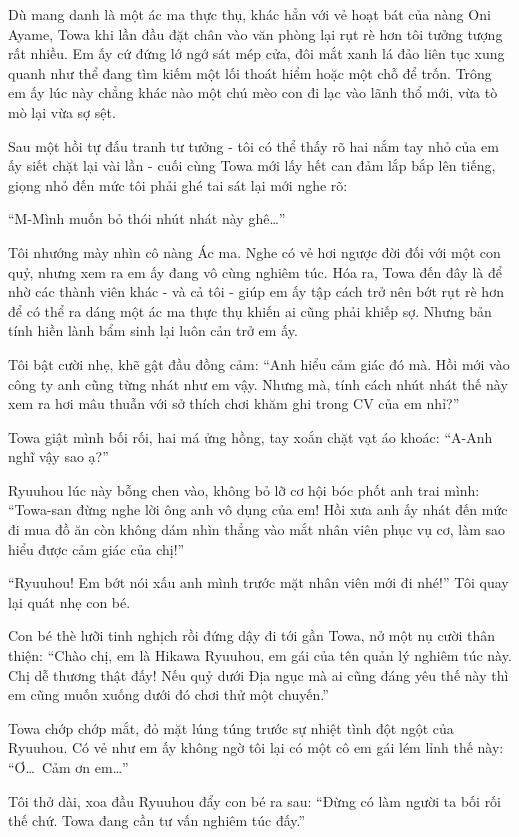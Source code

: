 \documentclass[../main.tex]{subfiles}
\begin{document}
Dù mang danh là một ác ma thực thụ, khác hẳn với vẻ hoạt bát của nàng Oni Ayame, Towa khi lần đầu đặt chân vào văn phòng lại rụt rè hơn tôi tưởng tượng rất nhiều. Em ấy cứ đứng lớ ngớ sát mép cửa, đôi mắt xanh lá đảo liên tục xung quanh như thể đang tìm kiếm một lối thoát hiểm hoặc một chỗ để trốn. Trông em ấy lúc này chẳng khác nào một chú mèo con đi lạc vào lãnh thổ mới, vừa tò mò lại vừa sợ sệt.

Sau một hồi tự đấu tranh tư tưởng - tôi có thể thấy rõ hai nắm tay nhỏ của em ấy siết chặt lại vài lần - cuối cùng Towa mới lấy hết can đảm lắp bắp lên tiếng, giọng nhỏ đến mức tôi phải ghé tai sát lại mới nghe rõ:

``M-Mình muốn bỏ thói nhút nhát này ghê\dots''

Tôi nhướng mày nhìn cô nàng Ác ma. Nghe có vẻ hơi ngược đời đối với một con quỷ, nhưng xem ra em ấy đang vô cùng nghiêm túc. Hóa ra, Towa đến đây là để nhờ các thành viên khác - và cả tôi - giúp em ấy tập cách trở nên bớt rụt rè hơn để có thể ra dáng một ác ma thực thụ khiến ai cũng phải khiếp sợ. Nhưng bản tính hiền lành bẩm sinh lại luôn cản trở em ấy.

Tôi bật cười nhẹ, khẽ gật đầu đồng cảm: ``Anh hiểu cảm giác đó mà. Hồi mới vào công ty anh cũng từng nhát như em vậy. Nhưng mà, tính cách nhút nhát thế này xem ra hơi mâu thuẫn với sở thích chơi khăm ghi trong CV của em nhỉ?''

Towa giật mình bối rối, hai má ửng hồng, tay xoắn chặt vạt áo khoác: ``A-Anh nghĩ vậy sao ạ?''

Ryuuhou lúc này bỗng chen vào, không bỏ lỡ cơ hội bóc phốt anh trai mình: ``Towa-san đừng nghe lời ông anh vô dụng của em! Hồi xưa anh ấy nhát đến mức đi mua đồ ăn còn không dám nhìn thẳng vào mắt nhân viên phục vụ cơ, làm sao hiểu được cảm giác của chị!''

``Ryuuhou! Em bớt nói xấu anh mình trước mặt nhân viên mới đi nhé!'' Tôi quay lại quát nhẹ con bé.

Con bé thè lưỡi tinh nghịch rồi đứng dậy đi tới gần Towa, nở một nụ cười thân thiện: ``Chào chị, em là Hikawa Ryuuhou, em gái của tên quản lý nghiêm túc này. Chị dễ thương thật đấy! Nếu quỷ dưới Địa ngục mà ai cũng đáng yêu thế này thì em cũng muốn xuống dưới đó chơi thử một chuyến.''

Towa chớp chớp mắt, đỏ mặt lúng túng trước sự nhiệt tình đột ngột của Ryuuhou. Có vẻ như em ấy không ngờ tôi lại có một cô em gái lém lỉnh thế này: ``Ơ\dots\ Cảm ơn em\dots''

Tôi thở dài, xoa đầu Ryuuhou đẩy con bé ra sau: ``Đừng có làm người ta bối rối thế chứ. Towa đang cần tư vấn nghiêm túc đấy.''
\end{document}
